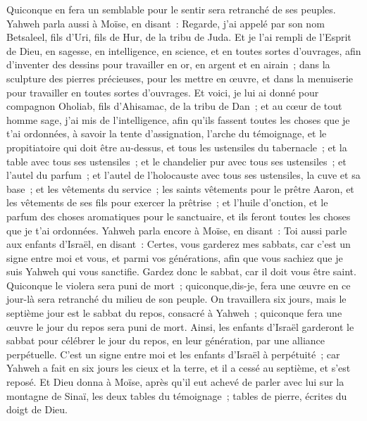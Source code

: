 \begin{multicols}{2}
Quiconque en fera un semblable pour le sentir sera retranché de ses peuples.
\VerseOne{}Yahweh parla aussi à Moïse, en disant~:
Regarde, j'ai appelé par son nom Betsaleel, fils d'Uri, fils de Hur, de la tribu de Juda.
Et je l'ai rempli de l'Esprit de Dieu, en sagesse, en intelligence, en science, et en toutes sortes d'ouvrages,
afin d'inventer des dessins pour travailler en or, en argent et en airain~;
dans la sculpture des pierres précieuses, pour les mettre en œuvre, et dans la menuiserie pour travailler en toutes sortes d'ouvrages.
Et voici, je lui ai donné pour compagnon Oholiab, fils d'Ahisamac, de la tribu de Dan~; et au cœur de tout homme sage, j'ai mis de l'intelligence, afin qu'ils fassent toutes les choses que je t'ai ordonnées,
à savoir la tente d'assignation, l'arche du témoignage, et le propitiatoire qui doit être au-dessus, et tous les ustensiles du tabernacle~;
et la table avec tous ses ustensiles~; et le chandelier pur avec tous ses ustensiles~; et l'autel du parfum~;
et l'autel de l'holocauste avec tous ses ustensiles, la cuve et sa base~;
et les vêtements du service~; les saints vêtements pour le prêtre Aaron, et les vêtements de ses fils pour exercer la prêtrise~;
et l'huile d'onction, et le parfum des choses aromatiques pour le sanctuaire, et ils feront toutes les choses que je t'ai ordonnées.
Yahweh parla encore à Moïse, en disant~:
Toi aussi parle aux enfants d'Israël, en disant~: Certes, vous garderez mes sabbats, car c'est un signe entre moi et vous, et parmi vos générations, afin que vous sachiez que je suis Yahweh qui vous sanctifie.
Gardez donc le sabbat, car il doit vous être saint. Quiconque le violera sera puni de mort~; quiconque,dis-je, fera une œuvre en ce jour-là sera retranché du milieu de son peuple.
On travaillera six jours, mais le septième jour est le sabbat du repos, consacré à Yahweh~; quiconque fera une œuvre le jour du repos sera puni de mort.
Ainsi, les enfants d'Israël garderont le sabbat pour célébrer le jour du repos, en leur génération, par une alliance perpétuelle.
C'est un signe entre moi et les enfants d'Israël à perpétuité~; car Yahweh a fait en six jours les cieux et la terre, et il a cessé au septième, et s'est reposé.
Et Dieu donna à Moïse, après qu'il eut achevé de parler avec lui sur la montagne de Sinaï, les deux tables du témoignage~; tables de pierre, écrites du doigt de Dieu.

\end{multicols}
